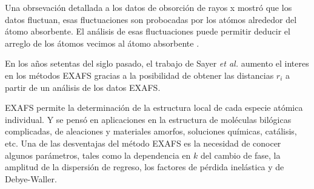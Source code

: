Una obrsevaci\'on detallada a los datos de obsorci\'on de rayos x
mostr\'o que los datos fluctuan, esas fluctuaciones son probocadas 
por los at\'omos alrededor del \'atomo absorbente. El an\'alisis de
esas fluctuaciones puede permitir deducir el arreglo de los \'atomos
vecimos al \'atomo absorbente \citep{Toni1989}. 

En los a\~nos setentas del siglo pasado, el trabajo de Sayer 
{\it et al.} aumento el interes en los m\'etodos EXAFS gracias a la
posibilidad de obtener las distancias $r_i$ a partir de un an\'alisis
de los datos EXAFS. 

EXAFS permite la determinaci\'on de la estructura local de cada 
especie at\'omica individual. Y se pens\'o en aplicaciones en la
estructura de mol\'eculas bil\'ogicas complicadas, de aleaciones y 
materiales amorfos, soluciones qu\'imicas, cat\'alisis, etc. Una de 
las desventajas del m\'etodo EXAFS es la necesidad de conocer 
algunos par\'ametros, tales como la dependencia en $k$ del cambio de
fase, la amplitud de la dispersi\'on de regreso, los factores de 
p\'erdida inel\'astica y de Debye-Waller.
